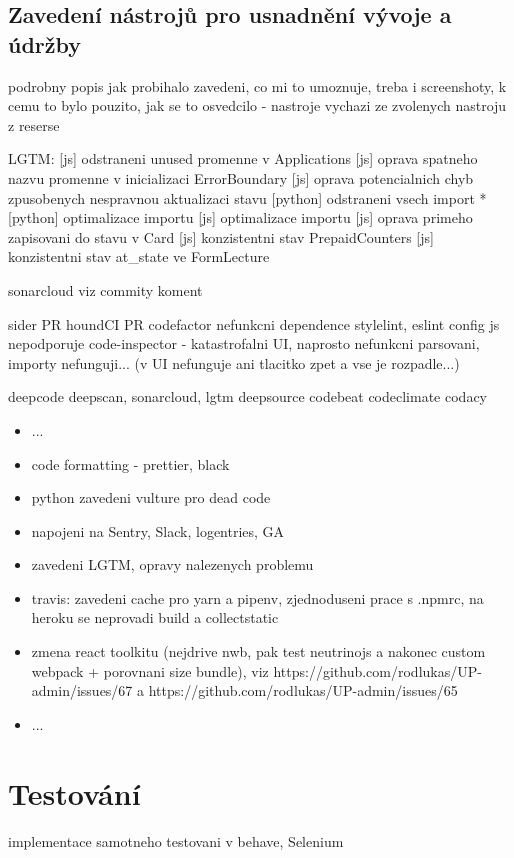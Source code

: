\section{Zavedení nástrojů pro usnadnění vývoje a údržby}
podrobny popis jak probihalo zavedeni, co mi to umoznuje, treba i screenshoty, k cemu to bylo pouzito, jak se to osvedcilo - nastroje vychazi ze zvolenych nastroju z reserse


LGTM: 
[js] odstraneni unused promenne v Applications
[js] oprava spatneho nazvu promenne v inicializaci ErrorBoundary
[js] oprava potencialnich chyb zpusobenych nespravnou aktualizaci stavu
[python] odstraneni vsech import *
[python] optimalizace importu
[js] optimalizace importu
[js] oprava primeho zapisovani do stavu v Card
[js] konzistentni stav PrepaidCounters
[js] konzistentni stav at\_state ve FormLecture

sonarcloud viz commity koment


sider PR
houndCI PR
codefactor nefunkcni dependence stylelint, eslint config js nepodporuje
code-inspector - katastrofalni UI, naprosto nefunkcni parsovani, importy nefunguji... (v UI nefunguje ani tlacitko zpet a vse je rozpadle...)


deepcode
deepscan, sonarcloud, lgtm
deepsource
codebeat
codeclimate
codacy
 
\begin{itemize}
\item ...
\item code formatting - prettier, black
\item python zavedeni vulture pro dead code
\item napojeni na Sentry, Slack, logentries, GA
\item zavedeni LGTM, opravy nalezenych problemu
\item travis: zavedeni cache pro yarn a pipenv, zjednoduseni prace s .npmrc, na heroku se neprovadi build a collectstatic
\item zmena react toolkitu (nejdrive nwb, pak test neutrinojs a nakonec custom webpack + porovnani size bundle), viz https://github.com/rodlukas/UP-admin/issues/67 a https://github.com/rodlukas/UP-admin/issues/65
\item ...
\end{itemize}


\chapter{Testování}
implementace samotneho testovani v behave, Selenium



